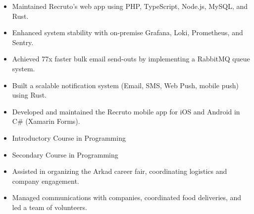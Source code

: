 \documentclass[10pt,a4paper,ragged2e]{altacv}
\begin{document}
\divider

\begin{itemize}
\item Maintained Recruto’s web app using PHP, TypeScript, Node.js, MySQL, and Rust.
\item Enhanced system stability with on-premise Grafana, Loki, Prometheus, and Sentry.
\item Achieved 77x faster bulk email send-outs by implementing a RabbitMQ queue system.
\item Built a scalable notification system (Email, SMS, Web Push, mobile push) using Rust.
\item Developed and maintained the Recruto mobile app for iOS and Android in C\# (Xamarin Forms).
\end{itemize}

\divider

\begin{itemize}
\item Introductory Course in Programming 
\item Secondary Course in Programming
\end{itemize}

\divider

\begin{itemize}
\item Assisted in organizing the Arkad career fair, coordinating logistics and company engagement.
\item Managed communications with companies, coordinated food deliveries, and led a team of volunteers.
\end{itemize}





\end{document}
